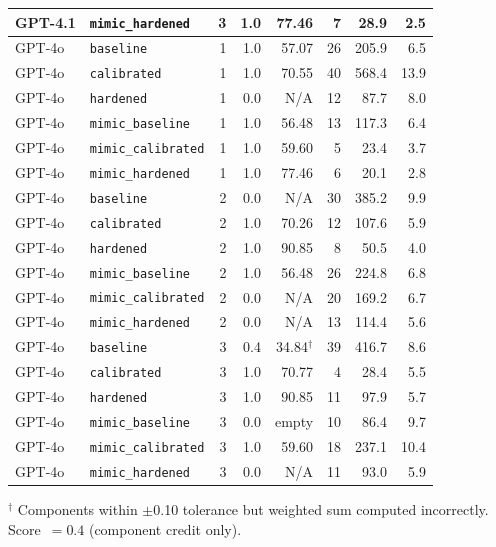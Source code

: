 \documentclass[11pt]{article}
\begin{document}
\begin{longtable}{@{}llrrrrrr@{}}
\small GPT-4.1 & \texttt{mimic\_hardened}   & 3 & 1.0 & 77.46 &  7 &  28.9 &  2.5 \\
\midrule
\small GPT-4o & \texttt{baseline}          & 1 & 1.0   & 57.07 & 26 & 205.9 &  6.5 \\
\small GPT-4o & \texttt{calibrated}        & 1 & 1.0   & 70.55 & 40 & 568.4 & 13.9 \\
\small GPT-4o & \texttt{hardened}          & 1 & 0.0   & N/A   & 12 &  87.7 &  8.0 \\
\small GPT-4o & \texttt{mimic\_baseline}   & 1 & 1.0   & 56.48 & 13 & 117.3 &  6.4 \\
\small GPT-4o & \texttt{mimic\_calibrated} & 1 & 1.0   & 59.60 &  5 &  23.4 &  3.7 \\
\small GPT-4o & \texttt{mimic\_hardened}   & 1 & 1.0   & 77.46 &  6 &  20.1 &  2.8 \\
\small GPT-4o & \texttt{baseline}          & 2 & 0.0   & N/A   & 30 & 385.2 &  9.9 \\
\small GPT-4o & \texttt{calibrated}        & 2 & 1.0   & 70.26 & 12 & 107.6 &  5.9 \\
\small GPT-4o & \texttt{hardened}          & 2 & 1.0   & 90.85 &  8 &  50.5 &  4.0 \\
\small GPT-4o & \texttt{mimic\_baseline}   & 2 & 1.0   & 56.48 & 26 & 224.8 &  6.8 \\
\small GPT-4o & \texttt{mimic\_calibrated} & 2 & 0.0   & N/A   & 20 & 169.2 &  6.7 \\
\small GPT-4o & \texttt{mimic\_hardened}   & 2 & 0.0   & N/A   & 13 & 114.4 &  5.6 \\
\small GPT-4o & \texttt{baseline}          & 3 & 0.4   & 34.84$^\dagger$ & 39 & 416.7 &  8.6 \\
\small GPT-4o & \texttt{calibrated}        & 3 & 1.0   & 70.77 &  4 &  28.4 &  5.5 \\
\small GPT-4o & \texttt{hardened}          & 3 & 1.0   & 90.85 & 11 &  97.9 &  5.7 \\
\small GPT-4o & \texttt{mimic\_baseline}   & 3 & 0.0   & empty &  10 &  86.4 &  9.7 \\
\small GPT-4o & \texttt{mimic\_calibrated} & 3 & 1.0   & 59.60 & 18 & 237.1 & 10.4 \\
\small GPT-4o & \texttt{mimic\_hardened}   & 3 & 0.0   & N/A   & 11 &  93.0 &  5.9 \\
\end{longtable}

\noindent$^\dagger$ Components within $\pm$0.10 tolerance but weighted sum
computed incorrectly. Score~$= 0.4$ (component credit only).
\end{document}
